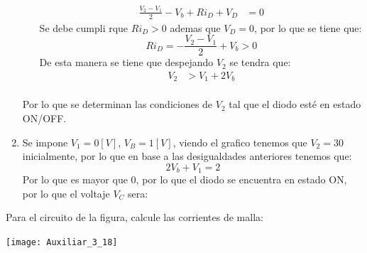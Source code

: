 \documentclass[
  11pt,
  letterpaper,
   addpoints,
   answers
  ]{exam}
\begin{document}
\begin{questions}
\begin{solution}
\begin{enumerate}
\begin{itemize}
\begin{align}
            \frac{V_{2}- V_{1}}{2} - V_{b} + Ri_{D} +V_{D}&= 0
        \end{align} 
        Se debe cumpli rque $Ri_{D} > 0 $ ademas que $V_{D} = 0$, por lo que se tiene que:
        \begin{equation}
            Ri_{D} = -\frac{V_{2}- V_{1}}{2} + V_{b} > 0 
        \end{equation}
        De esta manera se tiene que despejando $V_{2}$ se tendra que:
        \begin{align}
            V_{2} &> V_{1} + 2V_{b}\\
        \end{align}
    \end{itemize}
    Por lo que se determinan las condiciones de $V_2$ tal que el diodo esté en estado ON/OFF.
    \item Se impone $V_1 = 0 [V]$, $V_B = 1 [V]$, viendo el grafico tenemos que $V_{2}= 30$ inicialmente, por lo que en base a las desigualdades anteriores tenemos que:
    \begin{equation}
        2V_{b} + V_{1}= 2 
    \end{equation}
    Por lo que es mayor que $0$, por lo que el diodo se encuentra en estado ON, por lo que el voltaje $V_{C}$ sera:
\end{enumerate}
\end{solution}
\question
    Para el circuito de la figura, calcule las corrientes de malla:
    \begin{center}
        \texttt{[image: Auxiliar\_3\_18]}
    \end{center}
\end{questions}
\end{document}
